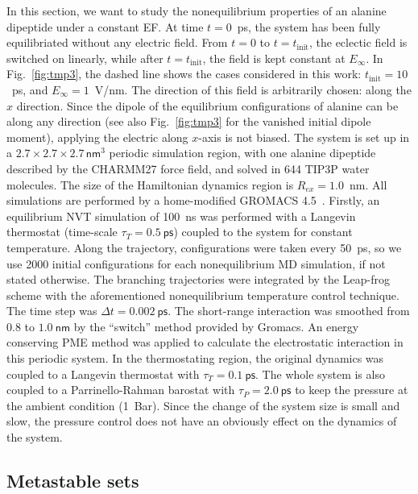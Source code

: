 \documentclass[aip,jcp,a4paper,preprint,onecolumn]{revtex4-1}
\begin{document}
In this section,
we want to study the nonequilibrium properties of an alanine dipeptide
under a constant EF. At time $t=0$~ps, the system
has been fully equilibriated without any electric field. From $t=0$ to
$t=t_{\textrm{init}}$, the eclectic field is switched on linearly, while
after $t=t_{\textrm{init}}$, the field is kept constant at
$E_{\infty}$. In Fig.~\ref{fig:tmp3}, the dashed line shows the 
cases considered in this work: $t_{\textrm{init}} = 10$~ps,
and $E_{\infty} = 1$~V/nm.
The direction of this field is arbitrarily chosen: along the
$x$ direction. Since the dipole of the equilibrium configurations of
alanine can be along any direction (see also Fig.~\ref{fig:tmp3} for
the vanished initial dipole moment), applying the electric along $x$-axis is
not biased.
The system is set up in a $2.7\times 2.7\times
2.7\, \textsf{nm}^3$ periodic simulation region, with one alanine dipeptide
described by the CHARMM27 force field, and solved in 644 TIP3P
water molecules.
The size of the  Hamiltonian dynamics region is $R_{ex} = 1.0$~nm.
All simulations are performed by a home-modified GROMACS 4.5~\cite{pronk2013gromacs}.
Firstly, an equilibrium NVT simulation of
100~\textsf{ns} was performed with a Langevin thermostat (time-scale
$\tau_T = 0.5~\textsf{ps}$) coupled to the system for constant
temperature.  Along the trajectory, configurations were taken every
50~\textsf{ps}, so we use 2000 initial configurations for each nonequilibrium
MD simulation, if not stated otherwise.
The branching trajectories were integrated by the
Leap-frog scheme with the aforementioned nonequilibrium
temperature control technique.  The
time step was $\Delta t = 0.002~\textsf{ps}$. The short-range
interaction was smoothed from $0.8$ to $1.0~\textsf{nm}$ by the
``switch'' method provided by Gromacs.  An energy conserving PME
method was applied to calculate the electrostatic interaction in this
periodic system. In the thermostating region, the original dynamics was
coupled to a Langevin thermostat with $\tau_T = 0.1~\textsf{ps}$.
The whole system is also coupled to a Parrinello-Rahman barostat with $\tau_P = 2.0~\textsf{ps}$ to keep
the pressure at the ambient condition (1~Bar). Since the
change of the system size is small and slow, the pressure control
does not have an obviously effect on the
dynamics of the system.

\subsection{Metastable sets}
\end{document}
